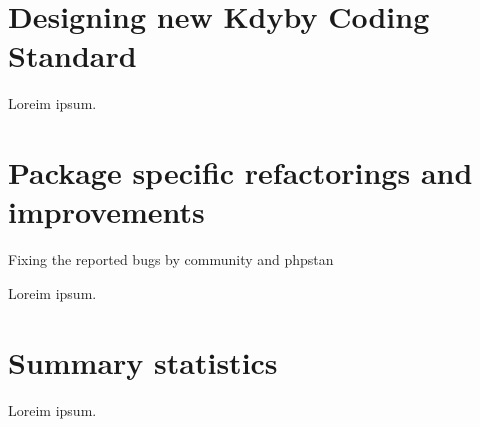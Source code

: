 \section{Designing new Kdyby Coding Standard}

Loreim ipsum.

\section{Package specific refactorings and improvements}

Fixing the reported bugs by community and \gls{phpstan}


Loreim ipsum.

\section{Summary statistics}

Loreim ipsum.
